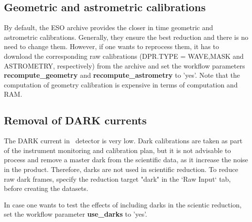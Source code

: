 \subsection{Geometric and astrometric calibrations}

By default, the ESO archive provides the closer in time geometric and
astrometric calibrations. Generally, they ensure the best reduction
and there is no need to change them. However, if one wants to
reprocess them, it has to download the corresponding raw calibrations
(DPR.TYPE = WAVE,MASK and ASTROMETRY, respectively) from the archive
and set the workflow parameters {\bf recompute\_geometry} and {\bf
  recompute\_astrometry} to 'yes'.  Note that the computation of
geometry calibration is expensive in terms of computation and RAM.

\subsection{Removal of DARK currents}

The DARK current in \instname\ detector is very low. Dark calibrations
are taken as part of the instrument monitoring and calibration plan,
but it is not advisable to process and remove a master dark from the
scientific data, as it increase the noise in the product.  Therefore,
darks are not used in scientific reduction. To reduce raw dark frames,
specify the reduction target "dark" in the `Raw Input` tab, before
creating the datasets.

In case one wants to test the effects of including darks in the
scientic reduction, set the workflow parameter {\bf use\_darks} to
'yes'.
